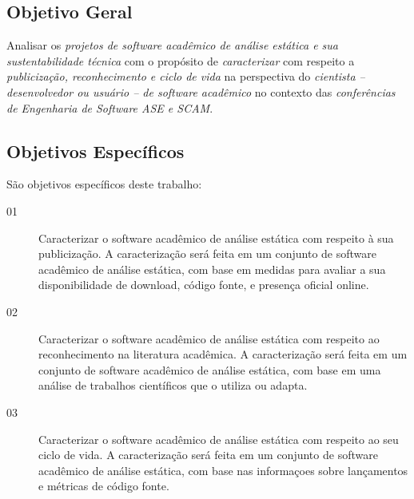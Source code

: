 \subsection{Objetivo Geral}

Analisar os \textit{projetos de software acadêmico de análise estática e sua sustentabilidade técnica} %
com o propósito de \textit{caracterizar} %
com respeito a \textit{publicização, reconhecimento e ciclo de vida} %
na perspectiva do \textit{cientista -- desenvolvedor ou usuário -- de software acadêmico} %
no contexto das \textit{conferências de Engenharia de Software ASE e SCAM}. %

%

\subsection{Objetivos Específicos}

São objetivos específicos deste trabalho:


\begin{description}
  \item [01]
    Caracterizar o software acadêmico de análise estática com respeito à sua
    publicização.
    A caracterização será feita em um conjunto de software acadêmico de análise
    estática, com base em medidas para avaliar a sua disponibilidade de
    download, código fonte, e presença oficial online.
  \item [02]
    Caracterizar o software acadêmico de análise estática com respeito ao
    reconhecimento na literatura acadêmica.
    A caracterização será feita em um conjunto de software acadêmico de análise
    estática, com base em uma análise de trabalhos científicos que o utiliza ou
    adapta.
  \item [03]
    Caracterizar o software acadêmico de análise estática com respeito ao
    seu ciclo de vida.
    A caracterização será feita em um conjunto de software acadêmico de análise
    estática, com base nas informaçoes sobre lançamentos e métricas de código
    fonte.
\end{description}

